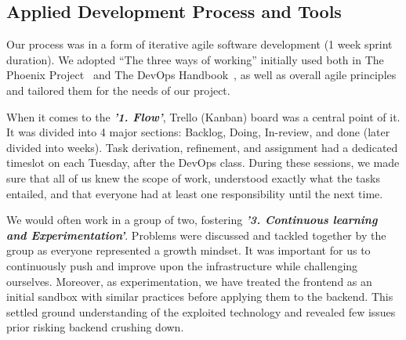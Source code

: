 \subsection{Applied Development Process and Tools}


Our process was in a form of iterative agile software development (1 week sprint duration). We adopted “The three ways of working” initially used both in The Phoenix Project~\cite{phoenixProject} and The DevOps Handbook~\cite{devOpsHandbook3W}, as well as overall agile principles and tailored them for the needs of our project.

When it comes to the \textbf{\textit{'1. Flow'}}, Trello (Kanban) board was a central point of it. It was divided into 4 major sections: Backlog, Doing, In-review, and done (later divided into weeks). Task derivation, refinement, and assignment had a dedicated timeslot on each Tuesday, after the DevOps class. During these sessions, we made sure that all of us knew the scope of work, understood exactly what the tasks entailed, and that everyone had at least one responsibility until the next time. 

We would often work in a group of two, fostering \textbf{\textit{'3. Continuous learning and Experimentation'}}. Problems were discussed and tackled together by the group as everyone represented a growth mindset. It was important for us to continuously push and improve upon the infrastructure while challenging ourselves. Moreover, as experimentation, we have treated the frontend as an initial sandbox with similar practices before applying them to the backend. This settled ground understanding of the exploited technology and revealed few issues prior risking backend crushing down.

